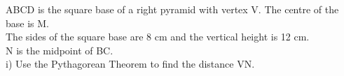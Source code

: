 \documentclass[preview]{standalone}
\begin{document}
\begin{center}
\begin{minipage}{12cm}\raggedright ABCD is the square base of a right pyramid with vertex V. The centre of the base is M.\\ The sides of the square base are 8 cm and the vertical height is 12 cm.\\ N is the midpoint of BC.\\ i) Use the Pythagorean Theorem to find the distance VN.\end{minipage}
\end{center}
\end{document}
